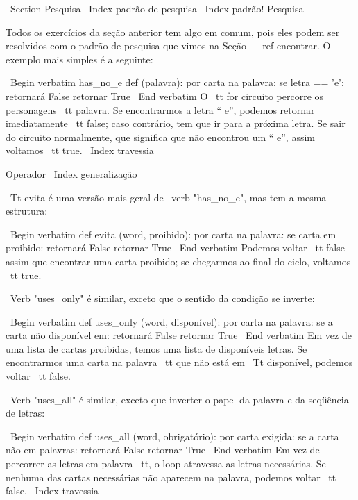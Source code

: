 \documentclass[10pt]{book}
\begin{document}
\begin {itemize}
{{{{{{\ Section {} Pesquisa
\ Index {padrão de pesquisa}
\ Index {padrão! Pesquisa}

Todos os exercícios da seção anterior tem algo
em comum, pois eles podem ser resolvidos com o padrão de pesquisa que vimos
na Seção ~ \ ref {} encontrar. O exemplo mais simples é a seguinte:

\ Begin {verbatim}
has_no_e def (palavra):
    por carta na palavra:
        se letra == 'e':
            retornará False
    retornar True
\ End {verbatim}
%
O {\ tt for} circuito percorre os personagens {\ tt palavra}. Se encontrarmos
a letra `` e'', podemos retornar imediatamente {\ tt false}; caso contrário,
tem que ir para a próxima letra. Se sair do circuito normalmente, que
significa que não encontrou um `` e'', assim voltamos {\ tt true}.
\ Index {travessia}


Operador%
\ Index {generalização}

{\ Tt evita} é uma versão mais geral de \ verb "has_no_e", mas
tem a mesma estrutura:

\ Begin {verbatim}
def evita (word, proibido):
    por carta na palavra:
        se carta em proibido:
            retornará False
    retornar True
\ End {verbatim}
%
Podemos voltar {\ tt false} assim que encontrar uma carta proibido;
se chegarmos ao final do ciclo, voltamos {\ tt true}.

\ Verb "uses_only" é similar, exceto que o sentido da condição
se inverte:

\ Begin {verbatim}
def uses_only (word, disponível):
    por carta na palavra: 
        se a carta não disponível em:
            retornará False
    retornar True
\ End {verbatim}
%
Em vez de uma lista de cartas proibidas, temos uma lista de disponíveis
letras. Se encontrarmos uma carta na palavra {\ tt} que não está em
{\ Tt disponível}, podemos voltar {\ tt false}.

\ Verb "uses_all" é similar, exceto que inverter o papel
da palavra e da seqüência de letras:

\ Begin {verbatim}
def uses_all (word, obrigatório):
    por carta exigida: 
        se a carta não em palavras:
            retornará False
    retornar True
\ End {verbatim}
%
Em vez de percorrer as letras em {palavra \ tt}, o loop
atravessa as letras necessárias. Se nenhuma das cartas necessárias
não aparecem na palavra, podemos voltar {\ tt false}.
\ Index {travessia}

}}}}}}
\end{itemize}
\end{document}
